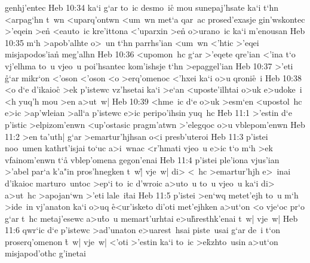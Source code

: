 genhj'entec\bibvsend
\vs Heb 10:34
ka`i
g`ar
to~ic
desmo~ic\r{}
mou
sunepaj'hsate
ka`i
t`hn
<arpag`hn
t~wn
<uparq'ontwn
<um~wn
met`a
qar~ac
prosed'exasje
gin'wskontec
>'eqein
>en\r{}
<eauto~ic
kre'ittona
<'uparxin
>en\r{}
o>urano~ic
ka`i
m'enousan\bibvsend
\vs Heb 10:35
m`h
>apob'alhte
o>~un
t`hn
parrhs'ian
<um~wn
<'htic
>'eqei
misjapodos'ian\r{}
meg'alhn\bibvsend
\vs Heb 10:36
<upomon~hc
g`ar
>'eqete
qre'ian
<'ina
t`o
vj'elhma
to~u
vjeo~u
poi'hsantec
kom'ishsje
t`hn
>epaggel'ian\bibvsend
\vs Heb 10:37
>'eti
\r{g}`ar
mikr`on
<'oson
<'oson
<o
>erq'omenoc
<'hxei
ka`i
o>u
qroni\r{e}~i\bibvsend
{}
\vs Heb 10:38
<o
d`e
d'ikaio\r{c}
>ek
p'istewc
vz'hsetai
ka`i
>e`an
<uposte'ilhtai
o>uk
e>udoke~i
<h
yuq'h
mou
>en
a>ut~w|\bibvsend
\vs Heb 10:39
<hme~ic
d`e
o>uk
>esm`en
<upostol~hc
e>ic
>ap'wleian
>all`a
p'istewc
e>ic
peripo'ihsin
yuq~hc\bibvsend
\vs Heb 11:1
>'estin
d`e
p'istic
>elpizom'enwn
<up'ostasic
pragm'atwn
>'elegqoc
o>u
vblepom'enwn\bibvsend
\vs Heb 11:2
>en
ta'uth|
g`ar
>emartur'hjhsan
o<i
presb'uteroi\bibvsend
\vs Heb 11:3
p'istei
noo~umen
kathrt'isjai
to`uc
a>i~wnac
<r'hmati
vjeo~u
e>ic
t`o
m`h
>ek
vfainom'enwn
t`a\r{}
vblep'omena
gegon'enai\bibvsend
\vs Heb 11:4
p'istei
ple'iona
vjus'ian
>'abel
par`a
k'a"in
pros'hnegken
t~w|\r{}
vje~w|
di>
<~hc
>emartur'hjh
e>~inai
d'ikaioc
marturo~untoc
>ep`i
to~ic
d'wroic
a>uto~u
to~u
vjeo~u
ka`i
di>
a>ut~hc
>apojan`wn
>'eti
lale~i\r{t}ai\bibvsend
{}
\vs Heb 11:5
p'istei
>en`wq
metet'ejh
to~u
m`h
>ide~in
vj'anaton
ka`i
o>uq
\r{e}<ur'isketo
di'oti
met'ejhken
a>ut`on
<o
vje`oc
pr`o
g`ar
t~hc
metaj'esewc
a>u\r{t}o~u
memart'urhtai
e>u\r{h}resthk'enai
t~w|
vje~w|\bibvsend
\vs Heb 11:6
qwr`ic
d`e
p'istewc
>ad'unaton
e>uarest~hsai
piste~usai
g`ar
de~i
t`on
proserq'omenon
\r{t}~w|
vje~w|
<'oti
>'estin
ka`i
to~ic
>e\r{k}zhto~usin
a>ut`on
misjapod'othc
g'inetai\bibvsend
